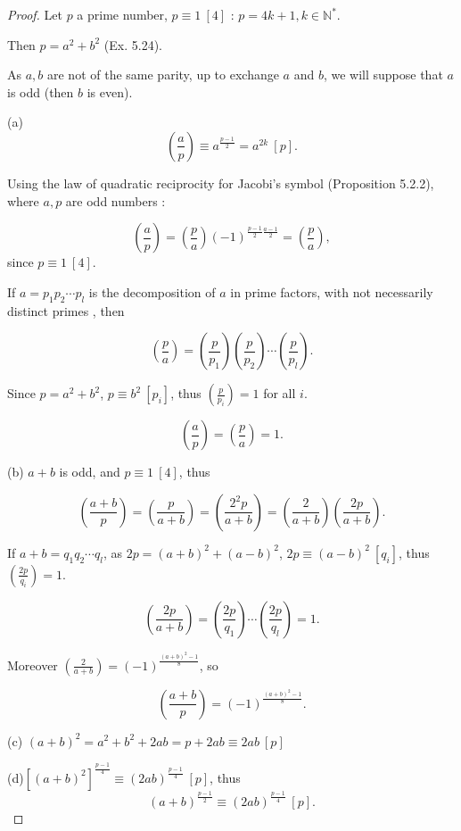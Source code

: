 \documentclass[11pt,a4paper]{article}
\newcommand{\legendre}[2]{\genfrac{(}{)}{}{}{#1}{#2}}
\begin{document}
\begin{proof}
Let $p$ a prime number, $p \equiv 1\  [4]$ : $p = 4k+1, k \in \mathbb{N}^*$.
  
Then  $p = a^2 + b^2$ (Ex. 5.24).
  
  As $a,b$ are not of the same parity, up to exchange $a$ and $b$, we will suppose that $a$ is odd (then  $b$ is even).
  
  (a) $$\legendre{a}{p} \equiv a^{\frac{p-1}{2}} = a^{2k} \ [p].$$
  
  Using the law of quadratic reciprocity for Jacobi's symbol (Proposition 5.2.2), where $a,p$ are odd numbers :
  
  $$\legendre{a}{p} = \legendre{p}{a} (-1)^{\frac{p-1}{2} \frac{a-1}{2}} = \legendre{p}{a},$$ since $p \equiv1 \ [4]$.
  
 If  $a = p_1 p_2 \cdots p_l$ is the decomposition of $a$ in prime factors, with not necessarily distinct primes , then
  
  $$\legendre{p}{a} = \legendre {p}{p_1}  \legendre {p}{p_2}\cdots \legendre {p}{p_l}.$$
  
Since $p = a^2+b^2$, $p \equiv b^2 \ [p_i]$, thus $\legendre {p}{p_i} = 1$ for all $i$.
  
  $$\legendre{a}{p} = \legendre{p}{a}=1.$$
  
   \vspace{0.5cm}
   (b) $a+b$ is odd, and $p \equiv 1 \ [4]$, thus
   
   $$\legendre{a+b}{p} = \legendre{p}{a+b} =\legendre{2^2 p}{a+b}= \legendre{2}{a+b} \legendre{2p}{a+b}.$$
  
 If $a+b = q_1 q_2 \cdots q_l$, as $2p = (a+b)^2 +(a-b)^2$,
   $2p \equiv (a-b)^2 \ [q_i]$, thus $\legendre {2p}{q_i}=1$.
  
  $$\legendre{2p}{a+b} = \legendre{2p}{q_1} \cdots \legendre {2p}{q_l} = 1.$$
  
  Moreover $\legendre {2}{a+b} = (-1)^{\frac{(a+b)^2-1}{8}}$, so
  
$$\legendre{a+b}{p} = (-1)^{\frac{(a+b)^2-1}{8}}.$$
  
     \vspace{0.5cm}
     (c) $(a+b)^2 = a^2 + b^2 + 2ab = p + 2ab \equiv 2ab \ [p]$
     
       \vspace{0.5cm}
       (d)$[(a+b)^2]^{\frac{p-1}{4}} \equiv (2ab)^{\frac{p-1}{4}} \ [p]$, thus
       $$(a+b)^{\frac{p-1}{2}} \equiv (2ab)^{\frac{p-1}{4}} \ [p].$$
\end{proof}
\end{document}
